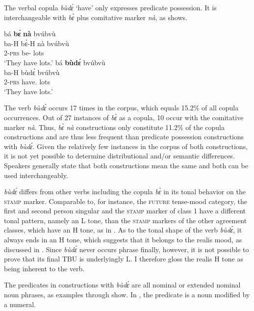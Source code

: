The verbal copula {\itshape bùdɛ́} `have' only expresses predicate possession. It is interchangeable with {\itshape bɛ̀} plus comitative marker {\itshape nà}, as  shows.

\ea \label{bude}
\ea\label{budea}
  \glll  bá {\bfseries bɛ́} {\bfseries nà} bvúbvù \\
        ba-H bɛ̀-H nà bvúbvù \\
         2-\textsc{prs} be-{\R} {\COM} lots\\
    \trans `They have lots.'
\ex\label{budeb}
  \glll  bá {\bfseries bùdɛ́} bvúbvù \\
        ba-H bùdɛ́ bvúbvù \\
         2-\textsc{prs} have.{\R} lots\\
    \trans `They have lots.'
\z
\z

The verb {\itshape bùdɛ́} occurs 17 times in the corpus, which equals 15.2\% of all copula occurrences. Out of 27 instances of {\itshape bɛ̀} as a copula, 10 occur with the comitative marker {\itshape nà}. Thus, {\itshape bɛ̀ nà} constructions only constitute 11.2\% of the copula constructions and are thus less frequent than predicate possession constructions with {\itshape bùdɛ́}. Given the relatively few instances in the corpus of both constructions, it is not yet possible to determine distributional and/or semantic differences. Speakers generally state that both constructions mean the same and both can be used interchangeably.

{\itshape bùdɛ́} differs from other verbs including the copula {\itshape bɛ̀} in its tonal behavior on the \textsc{stamp} marker. Comparable to, for instance, the \textsc{future} tense-mood category, the first and second person singular and the \textsc{stamp} marker of class 1 have a different tonal pattern, namely an L tone, than the \textsc{stamp} markers of the other agreement classes, which have an H tone, as in . As to the tonal shape of the verb {\itshape bùdɛ́}, it always ends in an H tone, which suggests that it belongs to the realis mood, as discussed in . Since {\itshape bùdɛ́} never occurs phrase finally, however, it is not possible to prove that its final TBU is underlyingly L. I therefore gloss the realis H tone as being inherent to the verb.

The predicates in constructions with {\itshape bùdɛ́} are all nominal or extended nominal noun phrases, as examples  through  show. In , the predicate is a noun modified by a numeral.

